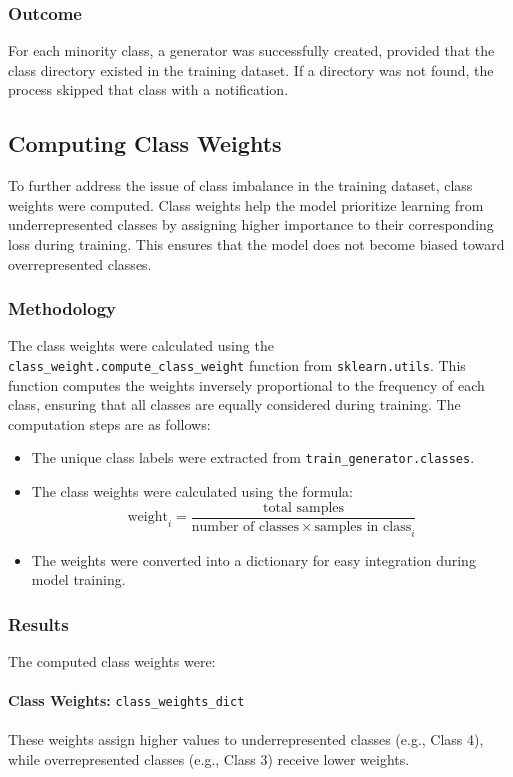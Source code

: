 \documentclass{article}
\begin{document}
\subsubsection{Outcome}

For each minority class, a generator was successfully created, provided that the class directory existed in the training dataset. If a directory was not found, the process skipped that class with a notification.

\subsection{Computing Class Weights}

To further address the issue of class imbalance in the training dataset, class weights were computed. Class weights help the model prioritize learning from underrepresented classes by assigning higher importance to their corresponding loss during training. This ensures that the model does not become biased toward overrepresented classes.

\subsubsection{Methodology}

The class weights were calculated using the \texttt{class\_weight.compute\_class\_weight} function from \texttt{sklearn.utils}. This function computes the weights inversely proportional to the frequency of each class, ensuring that all classes are equally considered during training. The computation steps are as follows:
\begin{itemize}
    \item The unique class labels were extracted from \texttt{train\_generator.classes}.
    \item The class weights were calculated using the formula:
    \[
    \text{weight}_{i} = \frac{\text{total samples}}{\text{number of classes} \times \text{samples in class}_{i}}
    \]
    \item The weights were converted into a dictionary for easy integration during model training.
\end{itemize}

\subsubsection{Results}

The computed class weights were:
\\\\
\textbf{Class Weights:} \texttt{class\_weights\_dict}
\\\\
These weights assign higher values to underrepresented classes (e.g., Class 4), while overrepresented classes (e.g., Class 3) receive lower weights. 
\end{document}
